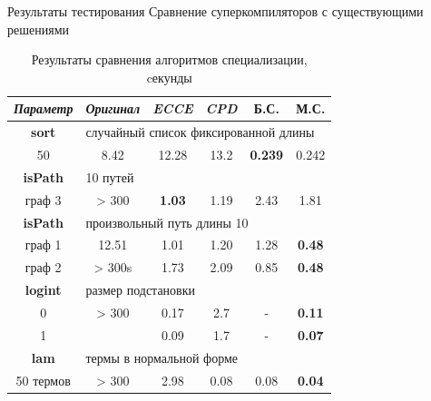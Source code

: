 \documentclass[xcolor=table]{beamer}
\begin{document}
\begin{frame}{Результаты тестирования}
    {\small Сравнение суперкомпиляторов с существующими решениями}
\begin{table}
\center
\begin{tabular}{|c|c|c|c|c|c|}
\hline
{\it Параметр} & {\it Оригинал} & {\it ECCE }  & {\it CPD} & {\bf Б.С.} & {\bf М.С.} \\ \hline
\rowcolor{black!10}
{\bf sort} & \multicolumn{5}{|l|}{случайный список фиксированной длины } \\ \hline
50       & 8.42     & 12.28 & 13.2 & {\bf 0.239} & 0.242 \\ \hline

\rowcolor{black!10}
 {\bf isPath} & \multicolumn{5}{|l|}{10 путей} \\ \hline
  граф 3      & > 300 & {\bf 1.03} & 1.19 & 2.43 & 1.81 \\ \hline
\rowcolor{black!10}
 {\bf isPath} & \multicolumn{5}{|l|}{произвольный путь длины 10} \\ \hline
 граф 1  &  12.51  & 1.01 & 1.20 & 1.28 &  {\bf 0.48} \\
 граф 2  &  > 300s & 1.73 & 2.09 & 0.85 & {\bf 0.48} \\ 
 \hline

\rowcolor{black!10}
{\bf logint} & \multicolumn{5}{|l|}{размер подстановки} \\ \hline
0 & > 300    & 0.17  & 2.7  & - & {\bf 0.11} \\
1 &          & 0.09  & 1.7  & - & {\bf 0.07} \\
\hline

\rowcolor{black!10}
{\bf lam} & \multicolumn{5}{|l|}{термы в нормальной форме} \\ \hline
50 термов & > 300    & 2.98  & 0.08 & 0.08 & {\bf 0.04}   \\
\hline
\end{tabular}
\caption{Результаты сравнения алгоритмов специализации, cекунды}
\label{fig:totalResult}
\end{table}
\end{frame}
\end{document}
